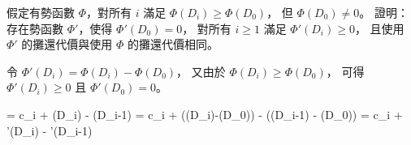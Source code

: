 \startEXERCISE
假定有勢函數 $\Phi$，對所有 $i$ 滿足 $\Phi(D_i)\ge\Phi(D_0)$，
但 $\Phi(D_0)\ne 0$。
證明：存在勢函數 $\Phi'$，使得 $\Phi'(D_0)=0$，
對所有 $i\ge 1$ 滿足 $\Phi'(D_i)\ge 0$，
且使用 $\Phi'$ 的攤還代價與使用 $\Phi$ 的攤還代價相同。
\stopEXERCISE

\startANSWER
令 $\Phi'(D_i)=\Phi(D_i)-\Phi(D_0)$，
又由於 $\Phi(D_i)\ge\Phi(D_0)$，
可得 $\Phi'(D_i)\ge 0$ 且 $\Phi'(D_0)=0$。

\startsplitformula\startmathalignment
\NC {} \NC= c_i + \Phi(D_i) - \Phi(D_{i-1}) \NR
\NC \NC= c_i
         + \left(\Phi(D_i)-\Phi(D_0)\right)
         - \left(\Phi(D_{i-1}) - \Phi(D_0)\right) \NR
\NC \NC= c_i + \Phi'(D_i) - \Phi'(D_{i-1}) \NR
\stopmathalignment\stopsplitformula

\stopANSWER
